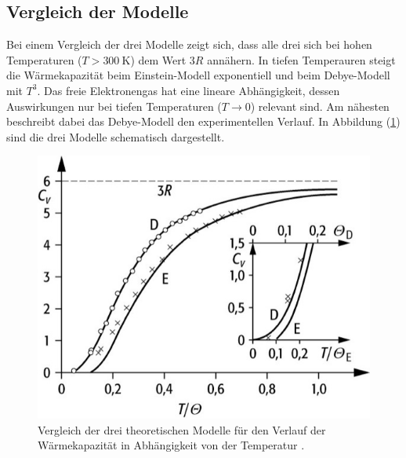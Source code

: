 \subsection{Vergleich der Modelle}
\label{sec:Vergleich der Modelle}
Bei einem Vergleich der drei Modelle zeigt sich, dass alle drei sich bei hohen Temperaturen ($T>\SI{300}{\kelvin}$) dem Wert $3R$ annähern. In tiefen Temperauren steigt die Wärmekapazität beim Einstein-Modell exponentiell und beim Debye-Modell mit $T^3$. Das freie Elektronengas hat eine lineare Abhängigkeit, dessen Auswirkungen nur bei tiefen Temperaturen ($T \rightarrow 0$) relevant sind. Am nähesten beschreibt dabei das Debye-Modell den experimentellen Verlauf. In Abbildung (\ref{fig:tkurve}) sind die drei Modelle schematisch dargestellt.
\begin{figure}
	\centering
	\includegraphics[scale=0.5]{fig/tkurve.png}
	\caption{Vergleich der drei theoretischen Modelle für den Verlauf der Wärmekapazität in Abhängigkeit von der Temperatur \cite{Anleitung10}.}
	\label{fig:tkurve}
\end{figure}
\FloatBarrier
